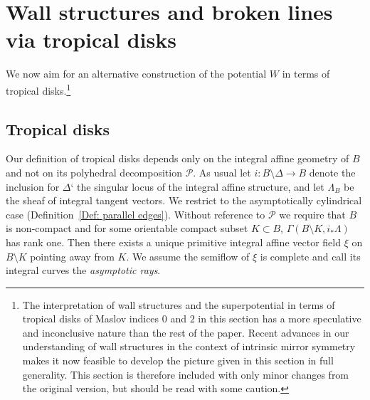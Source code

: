 \documentclass[11pt,letter]{amsart}
\theoremstyle{definition}
\theoremstyle{remark}
\numberwithin{equation}{section}
\numberwithin{figure}{section}
\renewcommand{\P}  {\mathscr{P}}
\begin{document}


\section{Wall structures and broken lines via tropical disks}
\label{sect:tropical disks}

We now aim for an alternative construction of the potential $W$ in terms of
tropical disks.\footnote{ The interpretation of wall structures and the
superpotential in terms of tropical disks of Maslov indices $0$ and $2$ in this
section has a more speculative and inconclusive nature than the rest of the
paper. Recent advances in our understanding of wall structures in the context of
intrinsic mirror symmetry \cite{CanonicalWalls} makes it now feasible to develop
the picture given in this section in full generality. This section is therefore
included with only minor changes from the original version, but should be read
with some caution.}

\subsection{Tropical disks}
\label{subsec:disks}
Our definition of tropical disks depends only on the integral affine geometry of
$B$ and not on its polyhedral decomposition $\P$. As usual let $i:
B\setminus\Delta \to B$ denote the inclusion for $\Delta$` the singular locus of
the integral affine structure, and let $\Lambda_B$ be the sheaf of integral
tangent vectors. We restrict to the asymptotically cylindrical case
(Definition~\ref{Def: parallel edges}). Without reference to $\P$ we require
that $B$ is non-compact and for some orientable compact subset $K\subset B$,
$\Gamma(B\setminus K, i_*\Lambda)$ has rank one. Then there exists a unique
primitive integral affine vector field $\xi$ on $B\setminus K$ pointing away
from $K$. We assume the semiflow of $\xi$ is complete and call its integral
curves the \emph{asymptotic rays}.
\end{document}
